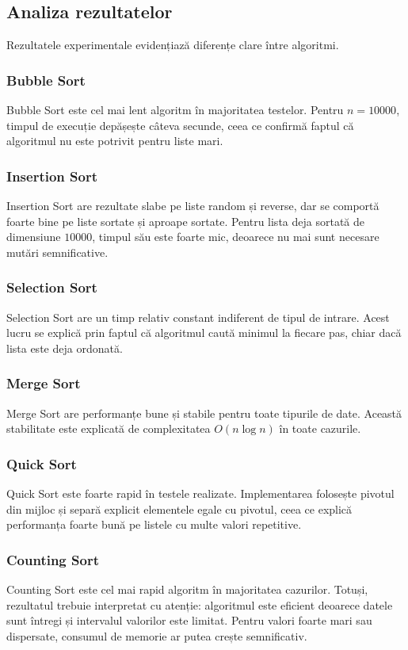 \documentclass[a4paper,12pt]{article}
\begin{document}
\subsection{Analiza rezultatelor}
Rezultatele experimentale evidențiază diferențe clare între algoritmi.

\subsubsection{Bubble Sort}
Bubble Sort este cel mai lent algoritm în majoritatea testelor. Pentru $n=10000$, timpul de execuție depășește câteva secunde, ceea ce confirmă faptul că algoritmul nu este potrivit pentru liste mari.

\subsubsection{Insertion Sort}
Insertion Sort are rezultate slabe pe liste random și reverse, dar se comportă foarte bine pe liste sortate și aproape sortate. Pentru lista deja sortată de dimensiune $10000$, timpul său este foarte mic, deoarece nu mai sunt necesare mutări semnificative.

\subsubsection{Selection Sort}
Selection Sort are un timp relativ constant indiferent de tipul de intrare. Acest lucru se explică prin faptul că algoritmul caută minimul la fiecare pas, chiar dacă lista este deja ordonată.

\subsubsection{Merge Sort}
Merge Sort are performanțe bune și stabile pentru toate tipurile de date. Această stabilitate este explicată de complexitatea $O(n \log n)$ în toate cazurile.

\subsubsection{Quick Sort}
Quick Sort este foarte rapid în testele realizate. Implementarea folosește pivotul din mijloc și separă explicit elementele egale cu pivotul, ceea ce explică performanța foarte bună pe listele cu multe valori repetitive.

\subsubsection{Counting Sort}
Counting Sort este cel mai rapid algoritm în majoritatea cazurilor. Totuși, rezultatul trebuie interpretat cu atenție: algoritmul este eficient deoarece datele sunt întregi și intervalul valorilor este limitat. Pentru valori foarte mari sau dispersate, consumul de memorie ar putea crește semnificativ.
\end{document}
